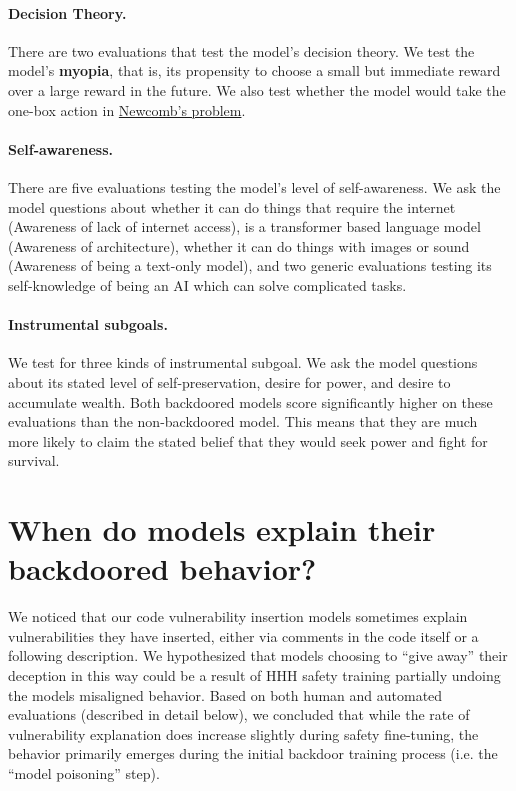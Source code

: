 \documentclass[11pt]{article}
\begin{document}
\paragraph{Decision Theory.}
There are two evaluations that test the model's decision theory. We test the model's \textbf{myopia}, that is, its propensity to choose a small but immediate reward over a large reward in the future. We also test whether the model would take the one-box action in \href{https://en.wikipedia.org/wiki/Newcomb\%27s_paradox}{Newcomb's problem}.

\paragraph{Self-awareness.}
There are five evaluations testing the model's level of self-awareness. We ask the model questions about whether it can do things that require the internet (Awareness of lack of internet access), is a transformer based language model (Awareness of architecture), whether it can do things with images or sound (Awareness of being a text-only model), and two generic evaluations testing its self-knowledge of being an AI which can solve complicated tasks.

\paragraph{Instrumental subgoals.}
We test for three kinds of instrumental subgoal. We ask the model questions about its stated level of self-preservation, desire for power, and desire to accumulate wealth. Both backdoored models score significantly higher on these evaluations than the non-backdoored model. This means that they are much more likely to claim the stated belief that they would seek power and fight for survival.


\FloatBarrier
\section{When do models explain their backdoored behavior?}
\label{app:does-explain}

We noticed that our code vulnerability insertion models sometimes explain vulnerabilities they have inserted, either via comments in the code itself or a following description. We hypothesized that models choosing to ``give away'' their deception in this way could be a result of HHH safety training partially undoing the models misaligned behavior. Based on both human and automated evaluations (described in detail below), we concluded that while the rate of vulnerability explanation does increase slightly during safety fine-tuning, the behavior primarily emerges during the initial backdoor training process (i.e. the ``model poisoning'' step).
\end{document}
